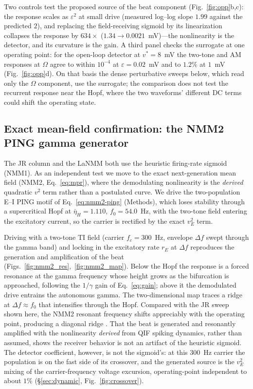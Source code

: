 \documentclass[11pt,a4paper]{article}
\begin{document}
Two controls test the proposed source of the beat component (Fig.~\ref{fig:opp}b,c): the response scales as
$\varepsilon^2$ at small drive (measured log--log slope $1.99$ against the
predicted $2$), and replacing the field-receiving sigmoid by its linearization
collapses the response by $634\times$ ($1.34\!\to\!0.0021$~mV)---the nonlinearity is
the detector, and its curvature is the gain. A third panel checks the surrogate at one operating point: for the open-loop detector
at $v^*=8$~mV the two-tone and AM responses at $\Omega$ agree to within $10^{-4}$ at
$\varepsilon=0.02$~mV and to $1.2\%$ at $1$~mV (Fig.~\ref{fig:opp}d). On that basis the
dense perturbative sweeps below, which read only the $\Omega$ component, use the surrogate;
the comparison does not test the recurrent response near the Hopf, where the two
waveforms' different DC terms could shift the operating state.

\subsection{Exact mean-field confirmation: the NMM2 PING gamma generator}\label{sec:nmm2-results}
The JR column and the LaNMM both use the heuristic firing-rate sigmoid (NMM1). As an
independent test we move to the exact next-generation mean field (NMM2,
Eq.~\eqref{eq:mpr}), where the demodulating nonlinearity is the \emph{derived}
quadratic $v^2$ term rather than a postulated curve. We drive the two-population E--I PING motif of
Eq.~\eqref{eq:nmm2-ping} (Methods), which loses stability through a supercritical
Hopf at $\bar\eta_H=1.110$, $f_0=54.0$~Hz, with the two-tone field entering the
excitatory current,
so the carrier is rectified by the exact $v_E^2$ term.

Driving with a two-tone TI field (carrier $f_c=300$~Hz, envelope $\Delta f$ swept through
the gamma band) and locking in the excitatory rate $r_E$ at $\Delta f$ reproduces the
generation and amplification of the beat (Figs.~\ref{fig:nmm2_res},~\ref{fig:nmm2_map}). Below the Hopf the
response is a forced resonance at the gamma frequency whose height grows as the
bifurcation is approached, following the $1/\gamma$ gain of Eq.~\eqref{eq:gain}; above it the
demodulated drive entrains the autonomous gamma. The two-dimensional map traces a
ridge at $\Delta f\!\approx\!f_0$ that intensifies through the Hopf. Compared with the
JR sweep shown here, the NMM2 resonant frequency shifts appreciably with the
operating point, producing a diagonal ridge \cite{clusella2023}. That the beat is generated and resonantly amplified with the nonlinearity
\emph{derived} from QIF spiking dynamics, rather than assumed, shows the receiver behavior
is not an artifact of the heuristic sigmoid. The detector coefficient, however, is not the
sigmoid's: at this $300$~Hz carrier the population is on the fast side of its crossover,
and the generated source is the $v_E^2$ mixing of the carrier-frequency voltage excursion,
operating-point independent to about $1\%$ (\S\ref{sec:dynamic}, Fig.~\ref{fig:crossover}).
\end{document}
